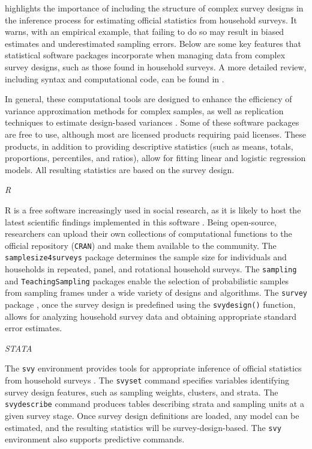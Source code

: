 \documentclass[
  12pt,
]{book}
\begin{document}
\citet[Section 7.8]{United_Nations_2005} highlights the importance of including the structure of complex survey designs in the inference process for estimating official statistics from household surveys. It warns, with an empirical example, that failing to do so may result in biased estimates and underestimated sampling errors. Below are some key features that statistical software packages incorporate when managing data from complex survey designs, such as those found in household surveys. A more detailed review, including syntax and computational code, can be found in \citet[Appendix A]{Heeringa_West_Berglund_2017}.

In general, these computational tools are designed to enhance the efficiency of variance approximation methods for complex samples, as well as replication techniques to estimate design-based variances \citep{Westat_2007}. Some of these software packages are free to use, although most are licensed products requiring paid licenses. These products, in addition to providing descriptive statistics (such as means, totals, proportions, percentiles, and ratios), allow for fitting linear and logistic regression models. All resulting statistics are based on the survey design.

\emph{R}

R is a free software increasingly used in social research, as it is likely to host the latest scientific findings implemented in this software \citep{R_2024}. Being open-source, researchers can upload their own collections of computational functions to the official repository (\texttt{CRAN}) and make them available to the community. The \texttt{samplesize4surveys} package \citep{ss4s} determines the sample size for individuals and households in repeated, panel, and rotational household surveys. The \texttt{sampling} \citep{Yves} and \texttt{TeachingSampling} \citep{TS} packages enable the selection of probabilistic samples from sampling frames under a wide variety of designs and algorithms. The \texttt{survey} package \citep{TL}, once the survey design is predefined using the \texttt{svydesign()} function, allows for analyzing household survey data and obtaining appropriate standard error estimates.

\emph{STATA}

The \texttt{svy} environment provides tools for appropriate inference of official statistics from household surveys \citep{STATA_2017}. The \texttt{svyset} command specifies variables identifying survey design features, such as sampling weights, clusters, and strata. The \texttt{svydescribe} command produces tables describing strata and sampling units at a given survey stage. Once survey design definitions are loaded, any model can be estimated, and the resulting statistics will be survey-design-based. The \texttt{svy} environment also supports predictive commands.
\end{document}
